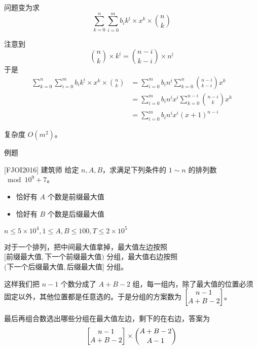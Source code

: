 \documentclass[UTF8]{beamer}
\begin{document}
    \begin{frame}
        问题变为求
        $$
        \sum_{k=0}^n\sum_{i=0}^m b_ik^{\underline i} \times x^k\times \binom nk
        $$
        
        \pause
        注意到
        $$
        \binom{n}{k}\times k^{\underline i} = \binom{n-i}{k-i}\times n^{\underline i}
        $$
        于是
        $$
        \begin{aligned}
        \sum_{k=0}^n\sum_{i=0}^m b_ik^{\underline i} \times x^k\times \binom nk&=\sum_{i=0}^mb_in^{\underline i}\sum_{k=0}^n\binom{n-i}{k-i}x^{k}\\
        &=\sum_{i=0}^mb_in^{\underline i}x^i\sum_{k=0}^{n-i}\binom{n-i}{k}x^k\\
        &=\sum_{i=0}^m b_in^{\underline i} x^i(x+1)^{n-i}
        \end{aligned}
        $$

        复杂度 $O(m^2)$。
    \end{frame}

    \begin{frame}{例题}
        \vspace{-0.2em}
        \begin{block}{[FJOI2016] 建筑师}
            给定 $n,A,B$，求满足下列条件的 $1\sim n$ 的排列数 $\bmod 10^9+7$。
            \begin{itemize}
                \item 恰好有 $A$ 个数是前缀最大值
                \item 恰好有 $B$ 个数是后缀最大值
            \end{itemize}
            $n\le 5\times 10^4,1\le A,B\le 100, T\le 2\times 10^5$
        \end{block}
        \pause
        对于一个排列，把中间最大值拿掉，最大值左边按照 $[\text{前缀最大值},\text{下一个前缀最大值})$ 分组，最大值右边按照 $(\text{下一个后缀最大值},\text{后缀最大值}]$ 分组。

        这样我们把 $n-1$ 个数分成了 $A+B-2$ 组，每一组内，除了最大值的位置必须固定以外，其他位置都是任意选的。于是分组的方案数为 $\st {n-1}{A+B-2}$。

        最后再组合数选出哪些分组在最大值左边，剩下的在右边，答案为
        $$
        \st{n-1}{A+B-2}\times \binom {A+B-2}{A-1}
        $$
    \end{frame}
\end{document}
